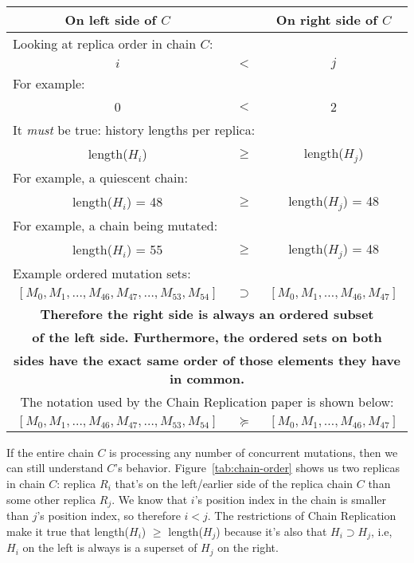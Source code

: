 \documentclass[preprint,10pt]{sigplanconf}
\begin{document}
\begin{figure*}
\centering
\begin{tabular}{ccc}
{\bf {{On left side of $C$}}} & & {\bf On right side of $C$} \\
\hline
\multicolumn{3}{l}{Looking at replica order in chain $C$:} \\
$i$ & $<$ & $j$ \\

\multicolumn{3}{l}{For example:} \\

0 & $<$ & 2 \\
\hline
\multicolumn{3}{l}{It {\em must} be true: history lengths per replica:} \\
length($H_i$) & $\geq$ & length($H_j$) \\
\multicolumn{3}{l}{For example, a quiescent chain:} \\
length($H_i$) = 48 & $\geq$ & length($H_j$) = 48 \\
\multicolumn{3}{l}{For example, a chain being mutated:} \\
length($H_i$) = 55 & $\geq$ & length($H_j$) = 48 \\
\multicolumn{3}{l}{Example ordered mutation sets:} \\
$[M_0,M_1,\ldots,M_{46},M_{47},\ldots,M_{53},M_{54}]$ & $\supset$ & $[M_0,M_1,\ldots,M_{46},M_{47}]$ \\
\multicolumn{3}{c}{\bf Therefore the right side is always an ordered
  subset} \\
\multicolumn{3}{c}{\bf of the left side.  Furthermore, the ordered
  sets on both} \\
\multicolumn{3}{c}{\bf sides have the exact same order of those elements they have in common.} \\
\multicolumn{3}{c}{The notation used by the Chain Replication paper is
shown below:} \\
$[M_0,M_1,\ldots,M_{46},M_{47},\ldots,M_{53},M_{54}]$ & $\succeq$ & $[M_0,M_1,\ldots,M_{46},M_{47}]$ \\

\end{tabular}
\caption{The ``Update Propagation Invariant'' as
  illustrated by Chain Replication protocol history.}
\label{tab:chain-order}
\end{figure*}

If the entire chain $C$ is processing any number of concurrent
mutations, then we can still understand $C$'s behavior.
Figure~\ref{tab:chain-order} shows us two replicas in chain $C$:
replica $R_i$ that's on the left/earlier side of the replica chain $C$
than some other replica $R_j$.  We know that $i$'s position index in
the chain is smaller than $j$'s position index, so therefore $i < j$.
The restrictions of Chain Replication make it true that length($H_i$)
$\ge$ length($H_j$) because it's also that $H_i \supset H_j$, i.e,
$H_i$ on the left is always is a superset of $H_j$ on the right.
\end{document}
